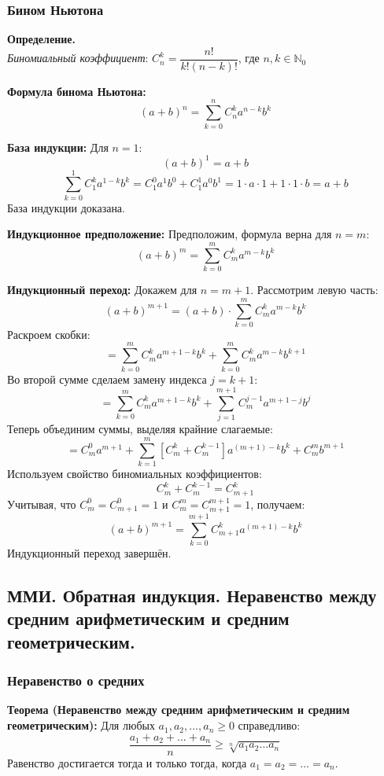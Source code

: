 \documentclass[12pt, a4paper]{article}
\begin{document}
\begin{centering}
\subsubsection{Бином Ньютона}
\begin{tcolorbox}
\textbf{Определение.}\\
\textit{Биномиальный коэффициент}:
$C_n^k = \dfrac{n!}{k!(n-k)!}$, где $n,k \in \mathbb{N}_0$\\
\end{tcolorbox}

\begin{tcolorbox}
\textbf{Формула бинома Ньютона:}
$$(a+b)^n = \sum_{k=0}^{n} C_n^k a^{n-k}b^k$$
\end{tcolorbox}

\begin{tcolorbox}[title=Доказательство по ММИ, breakable]
\textbf{База индукции:} Для $n=1$:
$$(a+b)^1 = a + b$$
$$\sum_{k=0}^{1} C_1^k a^{1-k}b^k = C_1^0 a^1 b^0 + C_1^1 a^0 b^1 = 1 \cdot a \cdot 1 + 1 \cdot 1 \cdot b = a + b$$
База индукции доказана.

\textbf{Индукционное предположение:} Предположим, формула верна для $n = m$:
$$(a+b)^m = \sum_{k=0}^{m} C_m^k a^{m-k}b^k$$

\textbf{Индукционный переход:} Докажем для $n = m+1$.
Рассмотрим левую часть:
$$(a+b)^{m+1} = (a+b) \cdot \sum_{k=0}^{m} C_m^k a^{m-k}b^k$$
Раскроем скобки:
$$= \sum_{k=0}^{m} C_m^k a^{m+1-k}b^k + \sum_{k=0}^{m} C_m^k a^{m-k}b^{k+1}$$
Во второй сумме сделаем замену индекса $j = k+1$:
$$= \sum_{k=0}^{m} C_m^k a^{m+1-k}b^k + \sum_{j=1}^{m+1} C_m^{j-1} a^{m+1-j}b^{j}$$
Теперь объединим суммы, выделяя крайние слагаемые:
$$= C_m^0 a^{m+1} + \sum_{k=1}^{m} \left[ C_m^k + C_m^{k-1} \right] a^{(m+1)-k}b^k + C_m^m b^{m+1}$$
Используем свойство биномиальных коэффициентов:
$$C_m^k + C_m^{k-1} = C_{m+1}^k$$
Учитывая, что $C_m^0 = C_{m+1}^0 = 1$ и $C_m^m = C_{m+1}^{m+1} = 1$, получаем:
$$(a+b)^{m+1} = \sum_{k=0}^{m+1} C_{m+1}^k a^{(m+1)-k}b^k$$
Индукционный переход завершён.
\end{tcolorbox}

\subsection{ММИ. Обратная индукция. Неравенство между средним арифметическим и средним геометрическим.}

\subsubsection*{Неравенство о средних}
\begin{tcolorbox}
\textbf{Теорема (Неравенство между средним арифметическим и средним геометрическим):}
Для любых $a_1, a_2, \dots, a_n \geq 0$ справедливо:
$$\frac{a_1 + a_2 + \dots + a_n}{n} \geq \sqrt[n]{a_1 a_2 \dots a_n}$$
Равенство достигается тогда и только тогда, когда $a_1 = a_2 = \dots = a_n$.
\end{tcolorbox}


\end{centering}
\end{document}

